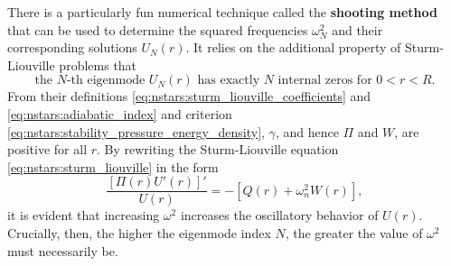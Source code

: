 
There is a particularly fun numerical technique called the \textbf{shooting method} that can be used to determine the squared frequencies $\omega_N^2$ and their corresponding solutions $U_N(r)$.
It relies on the additional property of Sturm-Liouville problems that
\begin{equation}
	\text{the $N$-th eigenmode $U_N(r)$ has exactly $N$ internal zeros for $0 < r < R$} .
\end{equation}
From their definitions \eqref{eq:nstars:sturm_liouville_coefficients} and \eqref{eq:nstars:adiabatic_index} and criterion \eqref{eq:nstars:stability_pressure_energy_density}, $\gamma$, and hence $\Pi$ and $W$, are positive for all $r$.
By rewriting the Sturm-Liouville equation \eqref{eq:nstars:sturm_liouville} in the form
\begin{equation}
\frac{\left[ \Pi(r) U'(r) \right]'}{U(r)} = - \left[ Q(r) + \omega_n^2 W(r) \right] ,
\end{equation}
it is evident that increasing $\omega^2$ increases the oscillatory behavior of $U(r)$.
Crucially, then, the higher the eigenmode index $N$, the greater the value of $\omega^2$ must necessarily be.


